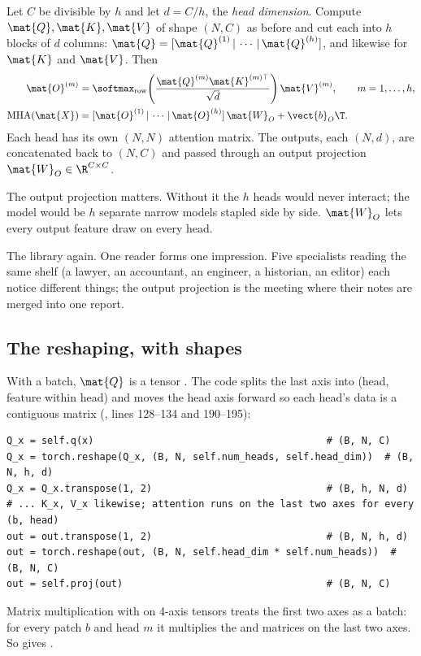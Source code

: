 \begin{definition}
Let $C$ be divisible by $h$ and let $d = C/h$, the \emph{head dimension}.
Compute $\mat{Q}, \mat{K}, \mat{V}$ of shape $(N, C)$ as before and cut each into $h$ blocks of
$d$ columns: $\mat{Q} = [\mat{Q}^{(1)}\,|\,\cdots\,|\,\mat{Q}^{(h)}]$, and likewise for
$\mat{K}$ and $\mat{V}$. Then
\begin{align}
  \mat{O}^{(m)} &= \softmax_{\text{row}}\!\left(\frac{\mat{Q}^{(m)}\mat{K}^{(m)\top}}{\sqrt d}\right)\mat{V}^{(m)}, \qquad m = 1,\dots,h, \label{eq:attention:head}\\
  \operatorname{MHA}(\mat{X}) &= [\mat{O}^{(1)}\,|\,\cdots\,|\,\mat{O}^{(h)}]\,\mat{W}_O + \vect{b}_O\T . \label{eq:attention:mha}
\end{align}
Each head has its own $(N, N)$ attention matrix. The outputs, each $(N, d)$, are concatenated
back to $(N, C)$ and passed through an output projection
$\mat{W}_O\in\R^{C\times C}$.
\end{definition}

The output projection matters. Without it the $h$ heads would never interact; the model would be
$h$ separate narrow models stapled side by side. $\mat{W}_O$ lets every output feature draw on
every head.

\begin{analogy}
The library again. One reader forms one impression. Five specialists reading the same shelf (a
lawyer, an accountant, an engineer, a historian, an editor) each notice different things; the
output projection is the meeting where their notes are merged into one report.
\end{analogy}

\subsection{The reshaping, with shapes}

With a batch, $\mat{Q}$ is a tensor . The code splits the last axis into
(head, feature within head) and moves the head axis forward so each head's data is a contiguous
 matrix (, lines 128--134 and 190--195):
\begin{lstlisting}
Q_x = self.q(x)                                        # (B, N, C)
Q_x = torch.reshape(Q_x, (B, N, self.num_heads, self.head_dim))  # (B, N, h, d)
Q_x = Q_x.transpose(1, 2)                              # (B, h, N, d)
# ... K_x, V_x likewise; attention runs on the last two axes for every (b, head)
out = out.transpose(1, 2)                              # (B, N, h, d)
out = torch.reshape(out, (B, N, self.head_dim * self.num_heads))  # (B, N, C)
out = self.proj(out)                                   # (B, N, C)
\end{lstlisting}
Matrix multiplication with  on 4-axis tensors treats the first two axes as a batch: for
every patch $b$ and head $m$ it multiplies the  and  matrices on the
last two axes. So  gives .

